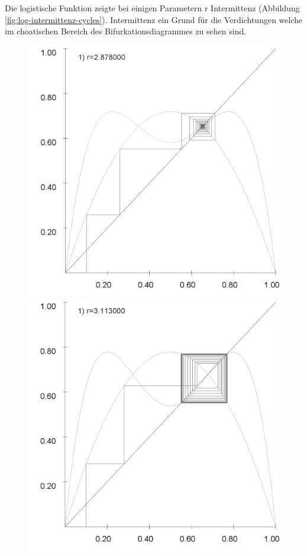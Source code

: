 \documentclass{scrartcl}
\begin{document}
Die logistische Funktion zeigte bei einigen Parametern r Intermittenz (Abbildung \ref{fig:log-intermittenz-cycles}). Intermittenz ein Grund für die Verdichtungen welche im choatischen Bereich des Bifurkationsdiagrammes zu sehen sind.

\begin{figure}[!htbp]
\centering
\includegraphics[scale=0.18]{fixpunkt-2878}
\includegraphics[scale=0.18]{fixpunkt-311}

\end{figure}
\end{document}

